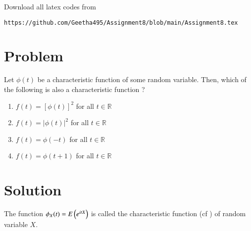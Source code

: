 \documentclass[journal,12pt,twocolumn]{IEEEtran}
\begin{document}
Download all latex codes from 
\begin{lstlisting}
https://github.com/Geetha495/Assignment8/blob/main/Assignment8.tex
\end{lstlisting}
\section{Problem}
Let $\phi(t)$ be a characteristic function of some random variable.  Then, which of the following is also a characteristic function ?
\begin{enumerate}
    \item $f(t) = [\phi(t)]^2$ for all $t \in \mathbb{R}$
    \item $f(t) = |\phi(t)|^2$ for all $t \in \mathbb{R}$
    \item $f(t) = \phi(-t)$ for all $t \in \mathbb{R}$
    \item $f(t) = \phi(t+1)$ for all $t \in \mathbb{R}$
\end{enumerate}
\section{Solution}
\begin{definition}
 The function $\phi_X(t) = E\left(e^{itX}\right)$ is called the characteristic function (cf ) of random variable $X$.
 \label{def:characterstic_function}
\end{definition}
\end{document}
